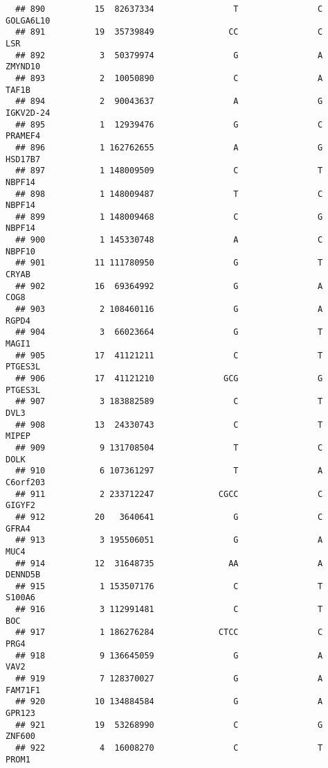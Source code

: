 \documentclass[12pt,twoside]{reedthesis}
\theoremstyle{definition}
\theoremstyle{definition}
\theoremstyle{remark}
\begin{document}
\begin{verbatim}
  ## 890          15  82637334                T                C      GOLGA6L10
  ## 891          19  35739849               CC                C            LSR
  ## 892           3  50379974                G                A        ZMYND10
  ## 893           2  10050890                C                A          TAF1B
  ## 894           2  90043637                A                G      IGKV2D-24
  ## 895           1  12939476                G                C        PRAMEF4
  ## 896           1 162762655                A                G        HSD17B7
  ## 897           1 148009509                C                T         NBPF14
  ## 898           1 148009487                T                C         NBPF14
  ## 899           1 148009468                C                G         NBPF14
  ## 900           1 145330748                A                C         NBPF10
  ## 901          11 111780950                G                T          CRYAB
  ## 902          16  69364992                G                A           COG8
  ## 903           2 108460116                G                A          RGPD4
  ## 904           3  66023664                G                T          MAGI1
  ## 905          17  41121211                C                T        PTGES3L
  ## 906          17  41121210              GCG                G        PTGES3L
  ## 907           3 183882589                C                T           DVL3
  ## 908          13  24330743                C                T          MIPEP
  ## 909           9 131708504                T                C           DOLK
  ## 910           6 107361297                T                A       C6orf203
  ## 911           2 233712247             CGCC                C         GIGYF2
  ## 912          20   3640641                G                C          GFRA4
  ## 913           3 195506051                G                A           MUC4
  ## 914          12  31648735               AA                A        DENND5B
  ## 915           1 153507176                C                T         S100A6
  ## 916           3 112991481                C                T            BOC
  ## 917           1 186276284             CTCC                C           PRG4
  ## 918           9 136645059                G                A           VAV2
  ## 919           7 128370027                G                A        FAM71F1
  ## 920          10 134884584                G                A         GPR123
  ## 921          19  53268990                C                G         ZNF600
  ## 922           4  16008270                C                T          PROM1

\end{verbatim}
\end{document}
